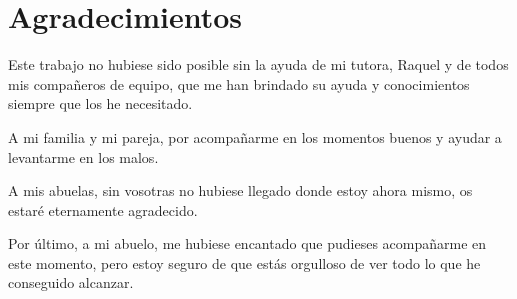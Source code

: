 \chapter*{Agradecimientos}

Este trabajo no hubiese sido posible sin la ayuda de mi tutora, Raquel y de todos mis compañeros de equipo, que me han brindado su ayuda y conocimientos siempre que los he necesitado.

A mi familia y mi pareja, por acompañarme en los momentos buenos y ayudar a levantarme en los malos.

A mis abuelas, sin vosotras no hubiese llegado donde estoy ahora mismo, os estaré eternamente agradecido.

Por último, a mi abuelo, me hubiese encantado que pudieses acompañarme en este momento, pero estoy seguro de que estás orgulloso de ver todo lo que he conseguido alcanzar.